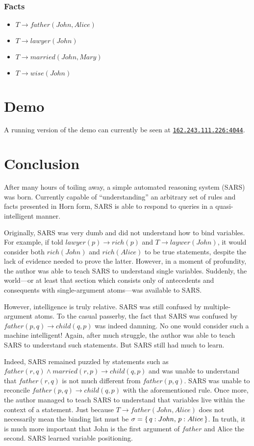 \documentclass{article}
\begin{document}
    \subsubsection{Facts}
      \begin{itemize}
        \item $T\rightarrow father(John,Alice)$
        \item $T\rightarrow lawyer(John)$
        \item $T\rightarrow married(John,Mary)$
        \item $T\rightarrow wise(John)$
      \end{itemize}

\section{Demo}
  A running version of the demo can currently be seen at
  \href{http://162.243.111.226:4044}{\texttt{162.243.111.226:4044}}.

\section{Conclusion}
  After many hours of toiling away, a simple automated reasoning system (SARS)
  was born. Currently capable of ``understanding'' an arbitrary set of rules and
  facts presented in Horn form, SARS is able to respond to queries in a
  quasi-intelligent manner.

  Originally, SARS was very dumb and did not understand how to bind variables.
  For example, if told $lawyer(p)\rightarrow rich(p)$ and $T\rightarrow
  laywer(John)$, it would consider both $rich(John)$ and $rich(Alice)$ to be
  true statements, despite the lack of evidence needed to prove the latter.
  However, in a moment of profundity, the author was able to teach SARS to
  understand single variables. Suddenly, the world---or at least that section
  which consists only of antecedents and consequents with single-argument
  atoms---was available to SARS.

  However, intelligence is truly relative. SARS was still confused by
  multiple-argument atoms. To the casual passerby, the fact that SARS was
  confused by $father(p,q)\rightarrow child(q,p)$ was indeed damning. No one
  would consider such a machine intelligent! Again, after much struggle, the
  author was able to teach SARS to understand such statements. But SARS still
  had much to learn.

  Indeed, SARS remained puzzled by statements such as $father(r,q)\wedge
  married(r,p)\rightarrow child(q,p)$ and was unable to understand that
  $father(r,q)$ is not much different from $father(p,q)$. SARS was unable to
  reconcile $father(p,q)\rightarrow child(q,p)$ with the aforementioned
  rule. Once more, the author managed to teach SARS to understand that variables
  live within the context of a statement. Just because $T\rightarrow
  father(John,Alice)$ does not necessarily mean the binding list must be $\sigma
  =\set{q:John,\,p:Alice}$. In truth, it is much more important that John is the
  first argument of $father$ and Alice the second. SARS learned variable
  positioning.
\end{document}
